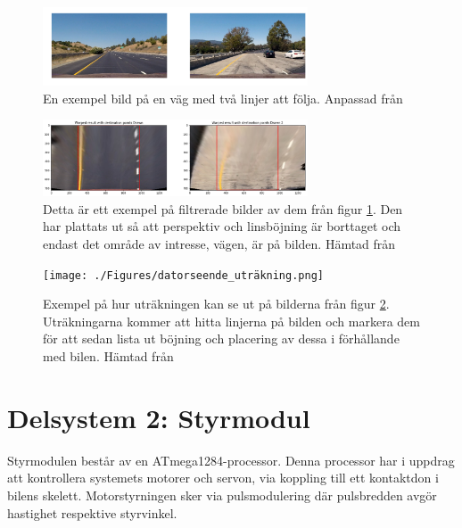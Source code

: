 \documentclass[10pt,oneside,swedish]{lips}
\begin{document}
\begin{figure}[htbp]
  \centering
  \includegraphics[width=0.7\textwidth]{./Figures/datorseende_normal.png}
  \caption{En exempel bild på en väg med två linjer att följa. Anpassad från \cite{Moataz} }
  \label{fig:datorseende_normal.png}
\end{figure}

\begin{figure}[htbp]
  \centering
  \includegraphics[width=0.7\textwidth]{./Figures/datorseende_filtrering.png}
  \caption{Detta är ett exempel på filtrerade bilder av dem från figur \ref{fig:datorseende_normal.png}. Den har plattats ut så att perspektiv och linsböjning är borttaget och endast det område av intresse, vägen, är på bilden. Hämtad från \cite{Moataz} }
  \label{fig:datorseende_filtrering.png}
\end{figure}

\begin{figure}[htbp]
  \centering
  \texttt{[image: ./Figures/datorseende\_uträkning.png]}
  \caption{Exempel på hur uträkningen kan se ut på bilderna från figur \ref{fig:datorseende_filtrering.png}. Uträkningarna kommer att hitta linjerna på bilden och markera dem för att sedan lista ut böjning och placering av dessa i förhållande med bilen. Hämtad från \cite{Moataz} }
  \label{fig:datorseende_uträkning.png}
    
\end{figure}





\pagebreak
\section{Delsystem 2: Styrmodul}
Styrmodulen består av en ATmega1284-processor. Denna processor har i uppdrag att kontrollera systemets motorer och servon, via koppling till ett kontaktdon i bilens skelett. Motorstyrningen sker via pulsmodulering där pulsbredden avgör hastighet respektive styrvinkel. 
\end{document}

